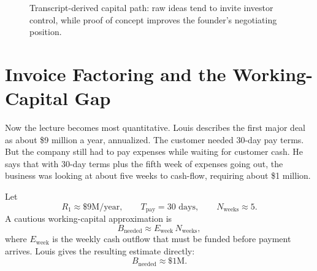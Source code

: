 \begin{figure}
\centering
{}
\caption{Transcript-derived capital path: raw ideas tend to invite investor control, while proof of concept improves the founder's negotiating position.}
\end{figure}

\section{Invoice Factoring and the Working-Capital Gap}

Now the lecture becomes most quantitative. Louis describes the first major deal as about \$9 million a year, annualized. The customer needed 30-day pay terms. But the company still had to pay expenses while waiting for customer cash. He says that with 30-day terms plus the fifth week of expenses going out, the business was looking at about five weeks to cash-flow, requiring about \$1 million.

Let
\[
R_1 \approx \$9\text{M/year},
\qquad
T_{\mathrm{pay}} = 30\text{ days},
\qquad
N_{\mathrm{weeks}} \approx 5.
\]
A cautious working-capital approximation is
\begin{equation}
B_{\mathrm{needed}} \approx E_{\mathrm{week}}\,N_{\mathrm{weeks}},
\end{equation}
where \(E_{\mathrm{week}}\) is the weekly cash outflow that must be funded before payment arrives. Louis gives the resulting estimate directly:
\begin{equation}
B_{\mathrm{needed}} \approx \$1\text{M}.
\end{equation}

